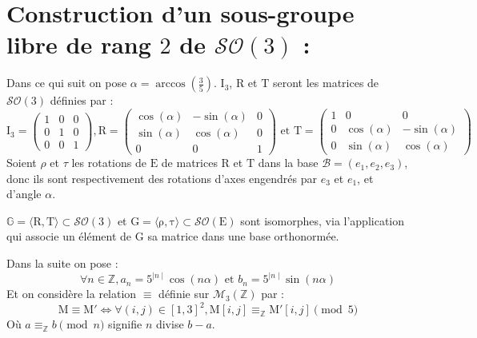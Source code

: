 \section{Construction d'un sous-groupe libre de rang $2$ de $\mathcal{SO}(3)$ :}
\noindent
Dans ce qui suit on pose $\alpha=\arccos(\frac{3}{5})$.
$\mathrm{I}_3$, $\mathrm{R}$ et $\mathrm{T}$ seront les matrices de $\mathcal{SO}(3)$ définies par :
\[
\mathrm{I}_3=
\begin{pmatrix}
1 & 0 & 0\\
0 & 1 & 0\\
0 & 0 & 1
\end{pmatrix}
,
\mathrm{R}=
\begin{pmatrix}
 \cos(\alpha) & -\sin(\alpha) & 0\\
 \sin(\alpha) & \cos(\alpha) & 0 \\
 0 & 0 & 1
\end{pmatrix}
\text{ et }
\mathrm{T}=
\begin{pmatrix}
   1 & 0 & 0 \\
 0 &\cos(\alpha) & -\sin(\alpha) \\
 0 & \sin(\alpha) & \cos(\alpha)
\end{pmatrix}
\]
Soient $\rho$ et $\tau$ les rotations de $\mathrm{E}$ de matrices $\mathrm{R}$ et $\mathrm{T}$ dans la base $\mathcal{B}=(e_1, e_2, e_3)$, donc ils sont respectivement des rotations d'axes engendrés par $e_3$ et $e_1$, et d'angle $\alpha$.
\begin{remarkk}
$\mathbb{G}=\langle \mathrm{R},\mathrm{T} \rangle \subset \mathcal{SO}(3)$ et $\mathrm{G}=\langle \mathrm{\rho},\mathrm{\tau} \rangle \subset \mathcal{SO}(\mathrm{E})$ sont isomorphes, via l'application qui associe un élément de $\mathrm{G}$ sa matrice dans une base orthonormée.
\end{remarkk}

\noindent
Dans la suite on pose :
$$ \forall n \in \mathbb{Z}, a_n = 5^{\mid n \mid}\cos(n\alpha) \text{ et } b_n = 5^{\mid n \mid}\sin(n\alpha)$$
Et on considère la relation $\equiv$ définie sur $\mathcal{M}_3(\mathbb{Z})$ par : $$\mathrm{M} \equiv \mathrm{M}' \Leftrightarrow \forall (i, j) \in [1, 3]^2, \mathrm{M}[i, j] \equiv_\mathbb{Z} \mathrm{M}'[i, j] \pmod 5$$
Où $a \equiv_\mathbb{Z} b \pmod n$ signifie $n$ divise $b-a$.

